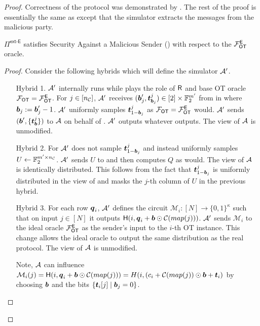 \begin{proof}
	Correctness of the protocol was demonstrated by \cite{RSA:OrrOrsSch17}. The rest of the proof is essentially the same as \cite{RSA:OrrOrsSch17} except that the simulator extracts the messages from the malicious party.
	\begin{claim}\label{claim:ext-E-MalSender}
		$\Pi^\textsf{ext-E}$ satisfies Security Against a Malicious Sender () with respect to the $\mathcal{F}_{\mathsf{OT}}^\mathsf{E}$ oracle.
	\end{claim}
	\begin{proof}
		Consider the following hybrids which will define the simulator $\mathcal{A}'$. 
		\begin{enumerate}[leftmargin=1.8cm]
			\item[Hybrid 1.] $\mathcal{A}'$ internally runs \Adv while plays the role of $\mathsf{R}$ and base OT oracle $\mathcal{F}_{\mathsf{OT}}=\mathcal{F}_{\mathsf{OT}}^\mathsf{E}$. For $j\in[{n_\mathcal{C}}]$, $\mathcal{A}'$ receives $(\boldsymbol{b}'_j,\boldsymbol{t}^j_{\boldsymbol{b}_j})\in [2]\times \mathbb{F}^{m'}_2$ from \Adv in  where $\boldsymbol{b}_j:=\boldsymbol{b}_j'-1$. $\mathcal{A}'$ uniformly samples $\boldsymbol{t}^j_{1-\boldsymbol{b}_j}$ as $\mathcal{F}_{\mathsf{OT}}=\mathcal{F}_{\mathsf{OT}}^\mathsf{E}$ would. $\mathcal{A}'$ sends $(\boldsymbol{b}', \{\boldsymbol{t}^j_{\boldsymbol{b}}\})$ to $\mathcal{A}$ on behalf of \OOT. $\mathcal{A}'$ outputs whatever \Adv outputs. The view of $\mathcal{A}$ is unmodified.
			
			\item[Hybrid 2.] For  $\mathcal{A}'$ does not sample $\boldsymbol{t}^j_{1-\boldsymbol{b}_j}$ and instead uniformly samples $U\gets\mathbb{F}^{m'\times {n_\mathcal{C}}}_2$. $\mathcal{A}'$ sends $U$ to \Adv and then computes $Q$ as \send would. The view of $\mathcal{A}$ is identically distributed. This follows from the fact that $\boldsymbol{t}^j_{1-\boldsymbol{b}_j}$ is uniformly distributed in the view of \Adv and masks the $j$-th column of $U$ in the previous hybrid. 
			
			\item[Hybrid 3.]\label{hybrid:malSendExtract} For each row $\boldsymbol{q}_i$, $\mathcal{A}'$ defines the circuit $\mathcal{M}_i:[N]\rightarrow\{0,1\}^\kappa$ such that on input $j\in[N]$ it outputs $\mathsf{H}(i, \boldsymbol{q}_i+\boldsymbol{b}\odot \mathcal{C}(map(j)))$. $\mathcal{A}'$ sends $\mathcal{M}_i$ to the ideal oracle $\mathcal{F}_{\mathsf{OT}}^\mathsf{E}$ as the sender's input to the $i$-th OT instance. This change allows the ideal oracle to output the same distribution as the real protocol. The view of $\mathcal{A}$ is unmodified.
			
			Note, $\mathcal{A}$ can influence $\mathcal{M}_i(j)=\mathsf{H}(i, \boldsymbol{q}_i+\boldsymbol{b}\odot \mathcal{C}(map(j)))=H(i, (c_i + \mathcal{C}(map(j)) \odot \boldsymbol{b} + \boldsymbol{t}_i)$ by choosing $\boldsymbol{b}$ and the bits $\{\boldsymbol{t}_i[j] \mid \boldsymbol{b}_j=0\}$.
			

\end{enumerate}
\end{proof}
\end{proof}
